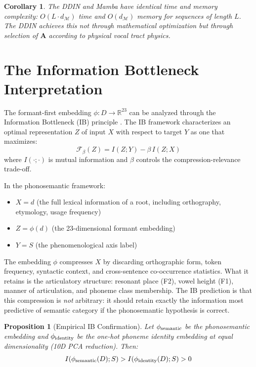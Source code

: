 \documentclass{article}
\newtheorem{corollary}{Corollary}
\newtheorem{proposition}{Proposition}
\begin{document}
\begin{corollary}
The DDIN and Mamba have identical time and memory complexity: $O(L \cdot d_\mathcal{M})$ time and $O(d_\mathcal{M})$ memory for sequences of length $L$. The DDIN achieves this not through mathematical optimization but through selection of $\mathbf{A}$ according to physical vocal tract physics.
\end{corollary}

\section{The Information Bottleneck Interpretation}
\label{sec:ib}

The formant-first embedding $\phi : D \to \mathbb{R}^{23}$ can be analyzed through the Information Bottleneck (IB) principle \cite{tishby2000}. The IB framework characterizes an optimal representation $Z$ of input $X$ with respect to target $Y$ as one that maximizes:
\[
\mathcal{F}_\beta(Z) = I(Z; Y) - \beta\,I(Z; X)
\]
where $I(\cdot;\cdot)$ is mutual information and $\beta$ controls the compression-relevance trade-off.

In the phonosemantic framework:
\begin{itemize}
  \item $X = d$ (the full lexical information of a root, including orthography, etymology, usage frequency)
  \item $Z = \phi(d)$ (the 23-dimensional formant embedding)
  \item $Y = S$ (the phenomenological axis label)
\end{itemize}

The embedding $\phi$ compresses $X$ by discarding orthographic form, token frequency, syntactic context, and cross-sentence co-occurrence statistics. What it retains is the articulatory structure: resonant place (F2), vowel height (F1), manner of articulation, and phoneme class membership. The IB prediction is that this compression is \textit{not} arbitrary: it should retain exactly the information most predictive of semantic category if the phonosemantic hypothesis is correct.

\begin{proposition}[Empirical IB Confirmation]
\label{prop:ib}
Let $\phi_{\rm semantic}$ be the phonosemantic embedding and $\phi_{\rm identity}$ be the one-hot phoneme identity embedding at equal dimensionality (10D PCA reduction). Then:
\[
I(\phi_{\rm semantic}(D); S) > I(\phi_{\rm identity}(D); S) > 0
\]
\end{proposition}
\end{document}
